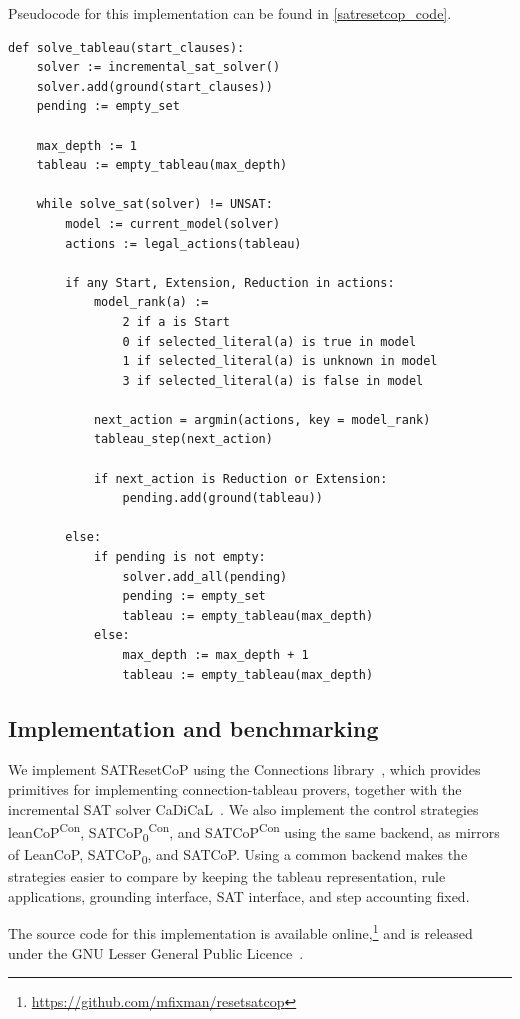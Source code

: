 \documentclass{EasyChair3.5/easychair}
\newcommand{\cop}[1]{\textsf{#1}}
\newcommand{\leancopc}{\cop{leanCoP\textsuperscript{Con}}}
\newcommand{\satcopzc}{\cop{SATCoP\textsubscript{0}\textsuperscript{Con}}}
\newcommand{\satcopc}{\cop{SATCoP\textsuperscript{Con}}}
\begin{document}
Pseudocode for this implementation can be found in \cref{satresetcop_code}.

\begin{lstlisting}[float,floatplacement=h,caption={Pseudocode of the \cop{SATResetCoP} control policy.},label={satresetcop_code}]
def solve_tableau(start_clauses):
	solver := incremental_sat_solver()
	solver.add(ground(start_clauses))
	pending := empty_set

	max_depth := 1
	tableau := empty_tableau(max_depth)

	while solve_sat(solver) != UNSAT:
		model := current_model(solver)
		actions := legal_actions(tableau)

		if any Start, Extension, Reduction in actions:
			model_rank(a) :=
				2 if a is Start
				0 if selected_literal(a) is true in model
				1 if selected_literal(a) is unknown in model
				3 if selected_literal(a) is false in model

			next_action = argmin(actions, key = model_rank)
			tableau_step(next_action)

			if next_action is Reduction or Extension:
				pending.add(ground(tableau))

		else:
			if pending is not empty:
				solver.add_all(pending)
				pending := empty_set
				tableau := empty_tableau(max_depth)
			else:
				max_depth := max_depth + 1
				tableau := empty_tableau(max_depth)
\end{lstlisting}


\subsection{Implementation and benchmarking}

We implement \cop{SATResetCoP} using the \cop{Connections} library~\cite{connections_2023}, which provides primitives for implementing connection-tableau provers, together with the incremental SAT solver \cop{CaDiCaL}~\cite{cadical20}.
We also implement the control strategies \leancopc{}, \satcopzc{}, and \satcopc{} using the same backend, as mirrors of \cop{LeanCoP}, \cop{SATCoP\textsubscript{0}}, and \cop{SATCoP}.
Using a common backend makes the strategies easier to compare by keeping the tableau representation, rule applications, grounding interface, SAT interface, and step accounting fixed.

The source code for this implementation is available online,\footnote{\url{https://github.com/mfixman/resetsatcop}} and is released under the GNU Lesser General Public Licence~\cite{lgpl}.
\end{document}
